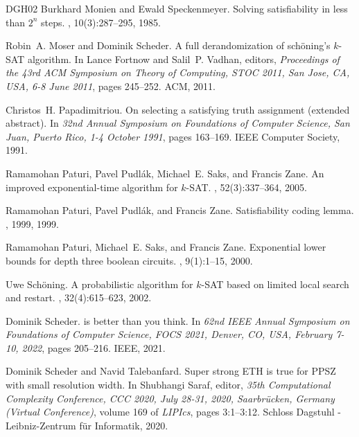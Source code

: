 \documentclass[10pt,a4paper]{article}
\begin{document}
\begin{thebibliography}{DGH{\etalchar{+}}02}
Burkhard Monien and Ewald Speckenmeyer.
\newblock Solving satisfiability in less than $2^n$ steps.
, 10(3):287--295, 1985.

Robin~A. Moser and Dominik Scheder.
\newblock A full derandomization of sch{\"{o}}ning's $k$-{SAT} algorithm.
\newblock In Lance Fortnow and Salil~P. Vadhan, editors, {\em Proceedings of
  the 43rd {ACM} Symposium on Theory of Computing, {STOC} 2011, San Jose, CA,
  USA, 6-8 June 2011}, pages 245--252. {ACM}, 2011.

Christos~H. Papadimitriou.
\newblock On selecting a satisfying truth assignment (extended abstract).
\newblock In {\em 32nd Annual Symposium on Foundations of Computer Science, San
  Juan, Puerto Rico, 1-4 October 1991}, pages 163--169. {IEEE} Computer
  Society, 1991.

Ramamohan Paturi, Pavel Pudl{\'{a}}k, Michael~E. Saks, and Francis Zane.
\newblock An improved exponential-time algorithm for $k$-{SAT}.
, 52(3):337--364, 2005.

Ramamohan Paturi, Pavel Pudl{\'{a}}k, and Francis Zane.
\newblock Satisfiability coding lemma.
, 1999, 1999.

Ramamohan Paturi, Michael~E. Saks, and Francis Zane.
\newblock Exponential lower bounds for depth three boolean circuits.
, 9(1):1--15, 2000.

Uwe Sch{\"{o}}ning.
\newblock A probabilistic algorithm for $k$-{SAT} based on limited local search
  and restart.
, 32(4):615--623, 2002.

Dominik Scheder.
 is better than you think.
\newblock In {\em 62nd {IEEE} Annual Symposium on Foundations of Computer
  Science, {FOCS} 2021, Denver, CO, USA, February 7-10, 2022}, pages 205--216.
  {IEEE}, 2021.

Dominik Scheder and Navid Talebanfard.
\newblock Super strong {ETH} is true for {PPSZ} with small resolution width.
\newblock In Shubhangi Saraf, editor, {\em 35th Computational Complexity
  Conference, {CCC} 2020, July 28-31, 2020, Saarbr{\"{u}}cken, Germany (Virtual
  Conference)}, volume 169 of {\em LIPIcs}, pages 3:1--3:12. Schloss Dagstuhl -
  Leibniz-Zentrum f{\"{u}}r Informatik, 2020.


\end{thebibliography}
\end{document}
